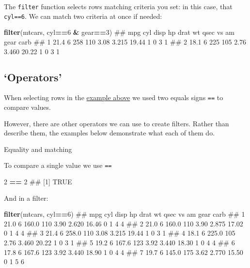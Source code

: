 \documentclass[]{article}
\newenvironment{Shaded}{\begin{snugshade}}{\end{snugshade}}
\newcommand{\KeywordTok}[1]{\textcolor[rgb]{0.13,0.29,0.53}{\textbf{#1}}}
\newcommand{\DecValTok}[1]{\textcolor[rgb]{0.00,0.00,0.81}{#1}}
\newcommand{\StringTok}[1]{\textcolor[rgb]{0.31,0.60,0.02}{#1}}
\newcommand{\OperatorTok}[1]{\textcolor[rgb]{0.81,0.36,0.00}{\textbf{#1}}}
\newcommand{\NormalTok}[1]{#1}
\theoremstyle{definition}
\theoremstyle{definition}
\theoremstyle{definition}
\theoremstyle{remark}
\begin{document}
The \texttt{filter} function selects rows matching criteria you set: in
this case, that \texttt{cyl==6}. We can match two criteria at once if
needed:

\begin{Shaded}
\begin{Highlighting}[]
\KeywordTok{filter}\NormalTok{(mtcars, cyl}\OperatorTok{==}\DecValTok{6} \OperatorTok{&}\StringTok{ }\NormalTok{gear}\OperatorTok{==}\DecValTok{3}\NormalTok{)}
\NormalTok{##    mpg cyl disp  hp drat    wt  qsec vs am gear carb}
\NormalTok{## 1 21.4   6  258 110 3.08 3.215 19.44  1  0    3    1}
\NormalTok{## 2 18.1   6  225 105 2.76 3.460 20.22  1  0    3    1}
\end{Highlighting}
\end{Shaded}

\subsection*{\texorpdfstring{`Operators'}{Operators}}\label{operators}

When selecting rows in the \protect\hyperlink{selecting-rows}{example
above} we used two equals signs \texttt{==} to compare values.

However, there are other operators we can use to create filters. Rather
than describe them, the examples below demonstrate what each of them do.

Equality and matching

To compare a single value we use \texttt{==}

\begin{Shaded}
\begin{Highlighting}[]
\DecValTok{2} \OperatorTok{==}\StringTok{ }\DecValTok{2}
\NormalTok{## [1] TRUE}
\end{Highlighting}
\end{Shaded}

And in a filter:

\begin{Shaded}
\begin{Highlighting}[]
\KeywordTok{filter}\NormalTok{(mtcars, cyl}\OperatorTok{==}\DecValTok{6}\NormalTok{)}
\NormalTok{##    mpg cyl  disp  hp drat    wt  qsec vs am gear carb}
\NormalTok{## 1 21.0   6 160.0 110 3.90 2.620 16.46  0  1    4    4}
\NormalTok{## 2 21.0   6 160.0 110 3.90 2.875 17.02  0  1    4    4}
\NormalTok{## 3 21.4   6 258.0 110 3.08 3.215 19.44  1  0    3    1}
\NormalTok{## 4 18.1   6 225.0 105 2.76 3.460 20.22  1  0    3    1}
\NormalTok{## 5 19.2   6 167.6 123 3.92 3.440 18.30  1  0    4    4}
\NormalTok{## 6 17.8   6 167.6 123 3.92 3.440 18.90  1  0    4    4}
\NormalTok{## 7 19.7   6 145.0 175 3.62 2.770 15.50  0  1    5    6}
\end{Highlighting}
\end{Shaded}
\end{document}
